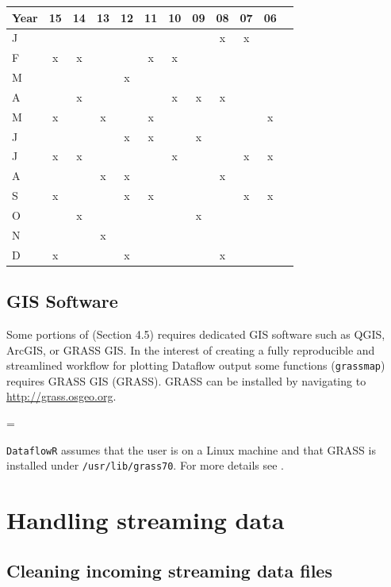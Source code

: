 \documentclass[12pt]{article}
\newenvironment{warning}
{\par\begin{mdframed}[linewidth=2pt,linecolor=red]
\begin{list}{}{\leftmargin=1cm
  \labelwidth=\leftmargin}\item[\Large\ding{43}]}
{\end{list}\end{mdframed}\par}
\begin{document}
\begin{center}
\begin{tabular}{l*{10} {c} r}
\hline
Year & 15 & 14 & 13 & 12 & 11 & 10 & 09 & 08 & 07 & 06\\ \hline
J &  &  &  &  &  &  &  & x & x & \\
F & x & x &  &  & x & x &  &  &  & \\
M &  &  &  & x &  &  &  &  &  & \\
A &  & x &  &  &  & x & x & x &  & \\
M & x &  & x &  & x &  &  &  &  & x \\
J &  &  &  & x & x &  & x &  &  & \\
J & x & x &  &  &  & x &  &  & x & x \\
A &  &  & x & x &  &  &  & x &  & \\
S & x &  &  & x & x &  &  &  & x & x \\
O &  & x &  &  &  &  & x &  &  & \\
N &  &  & x &  &  &  &  &  &  & \\
D & x &  &  & x &  &  &  & x &  & \\
\hline
\end{tabular}
\end{center}

\subsection{GIS Software}
Some portions of  (Section 4.5) requires dedicated GIS software such as QGIS, ArcGIS, or GRASS GIS. In the interest of creating a fully reproducible and streamlined workflow for plotting Dataflow output some functions (\texttt{grassmap}) requires GRASS GIS (GRASS). GRASS can be installed by navigating to \href{http://grass.osgeo.org}{http://grass.osgeo.org}.

\vspace{15pt}
\begin{warning}
\texttt{DataflowR} assumes that the user is on a Linux machine and that GRASS is installed under \texttt{/usr/lib/grass70}. For more details see \citet{rgrass7}.
\end{warning}

\section{Handling streaming data}
\subsection{Cleaning incoming streaming data files}
\end{document}
